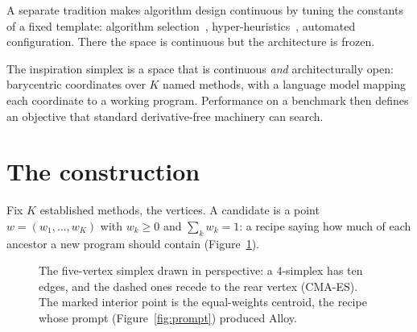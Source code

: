 \documentclass[11pt]{article}
\begin{document}
A separate tradition makes algorithm design continuous by tuning the
constants of a fixed template: algorithm selection~\cite{rice1976},
hyper-heuristics~\cite{burke2013}, automated configuration. There the space
is continuous but the architecture is frozen.

The inspiration simplex is a space that is continuous \emph{and}
architecturally open: barycentric coordinates over $K$ named methods, with
a language model mapping each coordinate to a working program. Performance
on a benchmark then defines an objective that standard derivative-free
machinery can search.

\section{The construction}

Fix $K$ established methods, the vertices. A candidate is a point
$w = (w_1, \dots, w_K)$ with $w_k \ge 0$ and $\sum_k w_k = 1$: a recipe
saying how much of each ancestor a new program should contain
(Figure~\ref{fig:simplex}).

\begin{figure}[h]
\centering
{}
\caption{The five-vertex simplex drawn in perspective: a $4$-simplex has
ten edges, and the dashed ones recede to the rear vertex (CMA-ES). The
marked interior point is the equal-weights centroid, the recipe whose
prompt (Figure~\ref{fig:prompt}) produced Alloy.}
\label{fig:simplex}
\end{figure}
\end{document}
